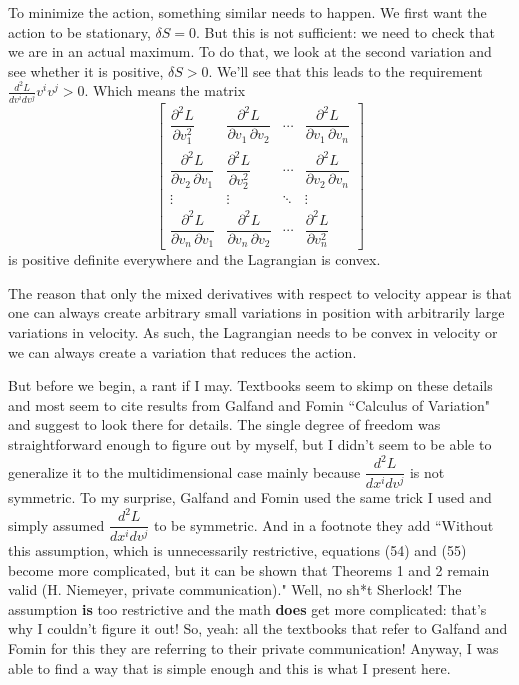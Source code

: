 \documentclass[aps,pra,10pt,floatfix,nofootinbib]{revtex4-1}
\theoremstyle{definition}
\begin{document}
To minimize the action, something similar needs to happen. We first want the action to be stationary, $\delta S = 0$. But this is not sufficient: we need to check that we are in an actual maximum. To do that, we look at the second variation and see whether it is positive, $\delta S > 0$. We'll see that this leads to the requirement $\frac{d^2L}{dv^i dv^j} v^i v^j > 0$. Which means the matrix
\begin{equation}
\begin{bmatrix}
\dfrac{\partial^2 L}{\partial v_1^2} & \dfrac{\partial^2 L}{\partial v_1\,\partial v_2} & \cdots & \dfrac{\partial^2 L}{\partial v_1\,\partial v_n} \\[2.2ex]
\dfrac{\partial^2 L}{\partial v_2\,\partial v_1} & \dfrac{\partial^2 L}{\partial v_2^2} & \cdots & \dfrac{\partial^2 L}{\partial v_2\,\partial v_n} \\[2.2ex]
\vdots & \vdots & \ddots & \vdots \\[2.2ex]
\dfrac{\partial^2 L}{\partial v_n\,\partial v_1} & \dfrac{\partial^2 L}{\partial v_n\,\partial v_2} & \cdots & \dfrac{\partial^2 L}{\partial v_n^2}
\end{bmatrix}
\label{lagHessian}
\end{equation}
is positive definite everywhere and the Lagrangian is convex.

The reason that only the mixed derivatives with respect to velocity appear is that one can always create arbitrary small variations in position with arbitrarily large variations in velocity. As such, the Lagrangian needs to be convex in velocity or we can always create a variation that reduces the action.

But before we begin, a rant if I may. Textbooks seem to skimp on these details and most seem to cite results from Galfand and Fomin ``Calculus of Variation" and suggest to look there for details. %
The single degree of freedom was straightforward enough to figure out by myself, but I didn't seem to be able to generalize it to the multidimensional case mainly because $\dfrac{d^2L}{dx^i dv^j}$ is not symmetric. To my surprise, Galfand and Fomin used the same trick I used and simply assumed $\dfrac{d^2L}{dx^i dv^j}$ to be symmetric. And in a footnote they add ``Without this assumption, which is unnecessarily restrictive, equations (54) and (55) become more complicated, but it can be shown that Theorems 1 and 2 remain valid (H. Niemeyer, private communication)." Well, no sh*t Sherlock! The assumption \textbf{is} too restrictive and the math \textbf{does} get more complicated: that's why I couldn't figure it out! So, yeah: all the textbooks that refer to Galfand and Fomin for this they are referring to their private communication! Anyway, I was able to find a way that is simple enough and this is what I present here.
\end{document}
